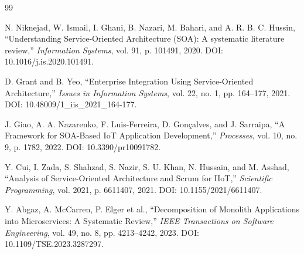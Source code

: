 \documentclass[conference]{IEEEtran}
\begin{document}
\begin{thebibliography}{99}

N. Niknejad, W. Ismail, I. Ghani, B. Nazari, M. Bahari, and A. R. B. C. Hussin,
``Understanding Service-Oriented Architecture (SOA): A systematic literature review,''
\textit{Information Systems},
vol. 91, p. 101491, 2020.
DOI: 10.1016/j.is.2020.101491.

D. Grant and B. Yeo,
``Enterprise Integration Using Service-Oriented Architecture,''
\textit{Issues in Information Systems},
vol. 22, no. 1, pp. 164--177, 2021.
DOI: 10.48009/1\_iis\_2021\_164-177.

J. Giao, A. A. Nazarenko, F. Luis-Ferreira, D. Gonçalves, and J. Sarraipa,
``A Framework for SOA-Based IoT Application Development,''
\textit{Processes},
vol. 10, no. 9, p. 1782, 2022.
DOI: 10.3390/pr10091782.

Y. Cui, I. Zada, S. Shahzad, S. Nazir, S. U. Khan, N. Hussain, and M. Asshad,
``Analysis of Service-Oriented Architecture and Scrum for IIoT,''
\textit{Scientific Programming},
vol. 2021, p. 6611407, 2021.
DOI: 10.1155/2021/6611407.

Y. Abgaz, A. McCarren, P. Elger et al.,
``Decomposition of Monolith Applications into Microservices: A Systematic Review,''
\textit{IEEE Transactions on Software Engineering},
vol. 49, no. 8, pp. 4213--4242, 2023.
DOI: 10.1109/TSE.2023.3287297.

\end{thebibliography}
\end{document}
